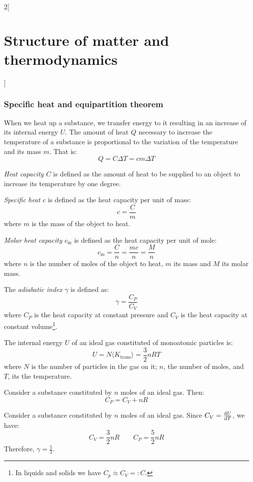 \documentclass[../../../main.tex]{subfiles}
\begin{document}
\begin{multicols}{2}[\section{Structure of matter and thermodynamics}]
  \subsubsection*{Specific heat and equipartition theorem}
  \begin{definition}
    When we heat up a substance, we transfer energy to it resulting in an increase of its internal energy $U$. The amount of heat $Q$ necessary to increase the temperature of a substance is proportional to the variation of the temperature and its mass $m$. That is:
    $$Q=C\Delta T=cm\Delta T$$
  \end{definition}
  \begin{definition}
    \textit{Heat capacity $C$} is defined as the amount of heat to be supplied to an object to increase its temperature by one degree.
  \end{definition}
  \begin{definition}
    \textit{Specific heat $c$} is defined as the heat capacity per unit of mass: $$c=\frac{C}{m}$$ where $m$ is the mass of the object to heat.
  \end{definition}
  \begin{definition}
    \textit{Molar heat capacity $c_\text{m}$} is defined as the heat capacity per unit of mole: $$c_\text{m}=\frac{C}{n}=\frac{mc}{n}=\frac{M}{n}$$ where $n$ is the number of moles of the object to heat, $m$ its mass and $M$ its molar mass.
  \end{definition}
  \begin{definition}
    The \textit{adiabatic index $\gamma$} is defined as:
    $$\gamma=\frac{C_P}{C_V}$$
    where $C_P$ is the heat capacity at constant pressure and $C_V$ is the heat capacity at constant volume\footnote{In liquids and solids we have $C_p\approx C_V=:C$.}.
  \end{definition}
  \begin{definition}
    The internal energy $U$ of an ideal gas constituted of monoatomic particles is:
    $$U=N\langle K_\text{trans}\rangle=\frac{3}{2}nRT$$
    where $N$ is the number of particles in the gas on it; $n$, the number of moles, and $T$, its the temperature.
  \end{definition}
  \begin{prop}
    Consider a substance constituted by $n$ moles of an ideal gas. Then:
    $$C_P=C_V+nR$$
  \end{prop}
  \begin{prop}
    Consider a substance constituted by $n$ moles of an ideal gas. Since $C_V=\dv{U}{T}$, we have: $$C_V=\frac{3}{2}nR\qquad C_P=\frac{5}{2}nR$$ Therefore, $\gamma=\frac{5}{3}$.

\end{prop}
\end{multicols}
\end{document}
